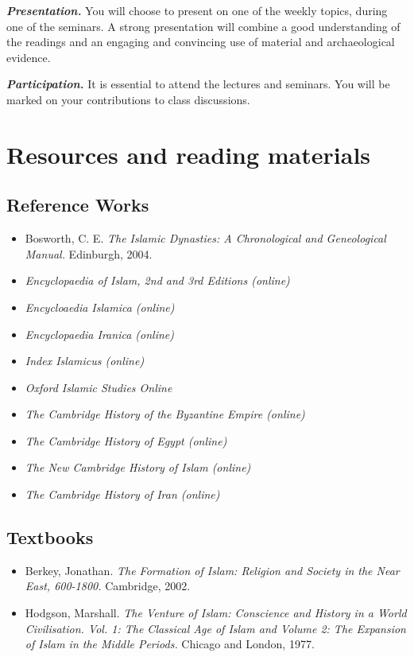 \documentclass[
]{book}
\providecommand{\tightlist}{%
  \setlength{\itemsep}{0pt}\setlength{\parskip}{0pt}}
\begin{document}
\textbf{\emph{Presentation.}} You will choose to present on one of the weekly topics, during one of the seminars. A strong presentation will combine a good understanding of the readings and an engaging and convincing use of material and archaeological evidence.

\textbf{\emph{Participation.}} It is essential to attend the lectures and seminars. You will be marked on your contributions to class discussions.

\hypertarget{resources-and-reading-materials}{%
\section{Resources and reading materials}\label{resources-and-reading-materials}}

\hypertarget{reference-works}{%
\subsection{Reference Works}\label{reference-works}}

\begin{itemize}
\tightlist
\item
  Bosworth, C. E. \emph{The Islamic Dynasties: A Chronological and Geneological Manual.} Edinburgh, 2004.
\item
  \emph{Encyclopaedia of Islam, 2nd and 3rd Editions (online)}
\item
  \emph{Encycloaedia Islamica (online)}
\item
  \emph{Encyclopaedia Iranica (online)}
\item
  \emph{Index Islamicus (online)}
\item
  \emph{Oxford Islamic Studies Online}
\item
  \emph{The Cambridge History of the Byzantine Empire (online)}
\item
  \emph{The Cambridge History of Egypt (online)}
\item
  \emph{The New Cambridge History of Islam (online)}
\item
  \emph{The Cambridge History of Iran (online)}
\end{itemize}

\hypertarget{textbooks}{%
\subsection{Textbooks}\label{textbooks}}

\begin{itemize}
\tightlist
\item
  Berkey, Jonathan. \emph{The Formation of Islam: Religion and Society in the Near East, 600-1800.} Cambridge, 2002.
\item
  Hodgson, Marshall. \emph{The Venture of Islam: Conscience and History in a World Civilisation. Vol. 1: The Classical Age of Islam and Volume 2: The Expansion of Islam in the Middle Periods.} Chicago and London, 1977.
\end{itemize}
\end{document}
